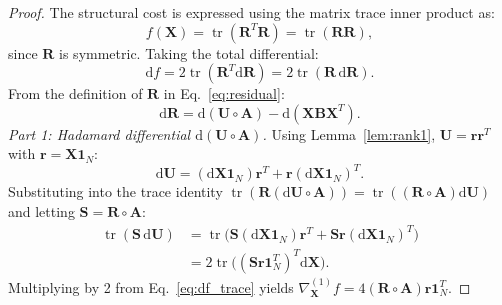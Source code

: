 \documentclass[a4paper,fleqn]{cas-dc}
\theoremstyle{thmstyleone}
\theoremstyle{thmstyletwo}
\theoremstyle{thmstylethree}
\begin{document}
\begin{proof}
The structural cost is expressed using the matrix trace inner product as:
\begin{equation}
f(\mathbf{X}) = \operatorname{tr}(\mathbf{R}^T \mathbf{R}) = \operatorname{tr}(\mathbf{R}\mathbf{R}),
\end{equation}
since $\mathbf{R}$ is symmetric. Taking the total differential:
\begin{equation}
\mathrm{d}f = 2\operatorname{tr}(\mathbf{R}^T \mathrm{d}\mathbf{R}) = 2\operatorname{tr}(\mathbf{R} \, \mathrm{d}\mathbf{R}).
\label{eq:df_trace}
\end{equation}
From the definition of $\mathbf{R}$ in Eq.~\eqref{eq:residual}:
\begin{equation}
\mathrm{d}\mathbf{R} = \mathrm{d}(\mathbf{U} \circ \mathbf{A}) - \mathrm{d}(\mathbf{X}\mathbf{B}\mathbf{X}^T).
\label{eq:dR}
\end{equation}
\textit{Part 1: Hadamard differential $\mathrm{d}(\mathbf{U} \circ \mathbf{A})$.} Using Lemma~\ref{lem:rank1}, $\mathbf{U} = \mathbf{r}\mathbf{r}^T$ with $\mathbf{r} = \mathbf{X}\mathbf{1}_N$:
\begin{equation}
\mathrm{d}\mathbf{U} = (\mathrm{d}\mathbf{X}\mathbf{1}_N)\mathbf{r}^T + \mathbf{r}(\mathrm{d}\mathbf{X}\mathbf{1}_N)^T.
\end{equation}
Substituting into the trace identity $\operatorname{tr}(\mathbf{R}(\mathrm{d}\mathbf{U} \circ \mathbf{A})) = \operatorname{tr}((\mathbf{R} \circ \mathbf{A})\mathrm{d}\mathbf{U})$ and letting $\mathbf{S} = \mathbf{R} \circ \mathbf{A}$:
\begin{align}
\operatorname{tr}(\mathbf{S} \, \mathrm{d}\mathbf{U}) &= \operatorname{tr}\big(\mathbf{S}(\mathrm{d}\mathbf{X}\mathbf{1}_N)\mathbf{r}^T + \mathbf{S}\mathbf{r}(\mathrm{d}\mathbf{X}\mathbf{1}_N)^T\big) \nonumber \\
&= 2\operatorname{tr}\big((\mathbf{S}\mathbf{r}\mathbf{1}_N^T)^T \mathrm{d}\mathbf{X}\big).
\end{align}
Multiplying by 2 from Eq.~\eqref{eq:df_trace} yields $\nabla_{\mathbf{X}}^{(1)} f = 4(\mathbf{R} \circ \mathbf{A})\mathbf{r}\mathbf{1}_N^T$.


\end{proof}
\end{document}
